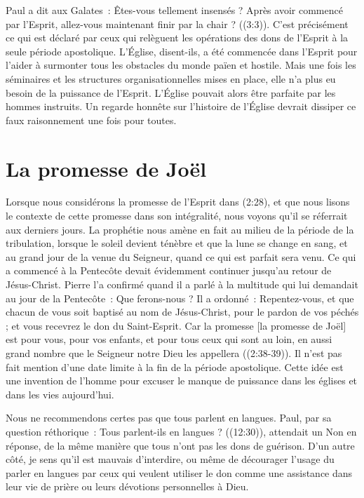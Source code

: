 Paul a dit aux Galates~: \og Êtes-vous tellement insensés ?
 Après avoir commencé par l'Esprit, allez-vous maintenant finir
 par la chair ? \fg{} ((3:3)).
 C'est précisément ce qui est déclaré par ceux qui relèguent
 les opérations des dons de l'Esprit à la seule période apostolique.
 L'Église, disent-ils, a été commencée dans l'Esprit pour l'aider
 à surmonter tous les obstacles du monde païen et hostile.
 Mais une fois les séminaires et les structures organisationnelles
 mises en place, elle n'a plus eu besoin de la puissance de l'Esprit.
 L'Église pouvait alors être parfaite par les hommes instruits.
 Un regarde honnête sur l'histoire de l'Église devrait dissiper
 ce faux raisonnement une fois pour toutes.


\section{La promesse de Jo\"el}

Lorsque nous considérons la promesse de l'Esprit dans (2:28),
 et que nous lisons le contexte de cette promesse dans son intégralité,
 nous voyons qu'il se réferrait aux derniers jours.
 La prophétie nous amène en fait au milieu de la période de la tribulation,
 lorsque le soleil devient ténèbre et que la lune se change en sang,
 et au grand jour de la venue du Seigneur, quand ce qui est parfait sera venu.
 Ce qui a commencé à la Pentecôte devait évidemment continuer jusqu'au retour
 de Jésus-Christ. Pierre l'a confirmé quand il a parlé à la multitude
 qui lui demandait au jour de la Pentecôte~: \og Que ferons-nous ? \fg{}
 Il a ordonné~: \og Repentez-vous, et que chacun de vous soit baptisé
 au nom de Jésus-Christ, pour le pardon de vos péchés ;
 et vous recevrez le don du Saint-Esprit. Car la promesse
 [la promesse de Joël] est pour vous, pour vos enfants,
 et pour tous ceux qui sont au loin, en aussi grand nombre
 que le Seigneur notre Dieu les appellera \fg{} ((2:38-39)).
 Il n'est pas fait mention d'une date limite à la fin de la période
 apostolique. Cette idée est une invention de l'homme pour excuser
 le manque de puissance dans les églises et dans les vies aujourd'hui.

Nous ne recommendons certes pas que tous parlent en langues.
 Paul, par sa question réthorique~: \og Tous parlent-ils en langues ? \fg{}
 ((12:30)), attendait un \og Non \fg{} en réponse,
 de la même manière que tous n'ont pas les dons de guérison.
 D'un autre côté, je sens qu'il est mauvais d'interdire,
 ou même de décourager l'usage du parler en langues par ceux
 qui veulent utiliser le don comme une assistance dans leur vie
 de prière ou leurs dévotions personnelles à Dieu.
\closechapter

